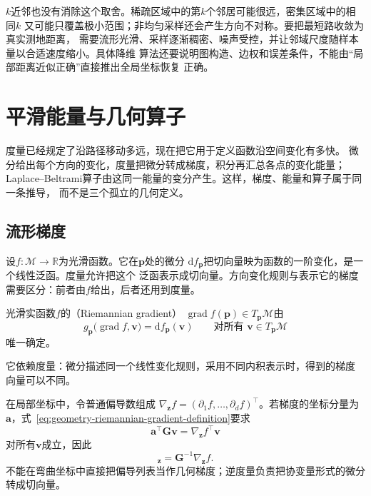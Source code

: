 $k$近邻也没有消除这个取舍。稀疏区域中的第$k$个邻居可能很远，密集区域中的相同$k$
又可能只覆盖极小范围；非均匀采样还会产生方向不对称。要把最短路收敛为真实测地距离，
需要流形光滑、采样逐渐稠密、噪声受控，并让邻域尺度随样本量以合适速度缩小。具体降维
算法还要说明图构造、边权和误差条件，不能由“局部距离近似正确”直接推出全局坐标恢复
正确。

\section{平滑能量与几何算子}
\label{sec:geometry-smoothness-geometric-operators}

度量已经规定了沿路径移动多远，现在把它用于定义函数沿空间变化有多快。
微分给出每个方向的变化，度量把微分转成梯度，积分再汇总各点的变化能量；
Laplace--Beltrami算子由这同一能量的变分产生。这样，梯度、能量和算子属于同一条推导，
而不是三个孤立的几何定义。

\subsection{流形梯度}

设$f:\mathcal{M}\to\mathbb{R}$为光滑函数。它在$\bm{p}$处的微分
$\mathrm{d}f_{\bm{p}}$把切向量映为函数的一阶变化，是一个线性泛函。度量允许把这个
泛函表示成切向量。方向变化规则与表示它的梯度需要区分：前者由$f$给出，后者还用到度量。

\begin{definition}[Riemann梯度]
\label{def:geometry-riemannian-gradient}
光滑实函数$f$的（Riemannian gradient）
$\operatorname{grad}f(\bm{p})\in T_{\bm{p}}\mathcal{M}$由
\begin{equation}
  g_{\bm{p}}\bigl(
    \operatorname{grad}f,\bm{v}
  \bigr)
  =
  \mathrm{d}f_{\bm{p}}(\bm{v})
  \qquad
  \text{对所有 }\bm{v}\in T_{\bm{p}}\mathcal{M}
  \label{eq:geometry-riemannian-gradient-definition}
\end{equation}
唯一确定。
\end{definition}

它依赖度量：微分描述同一个线性变化规则，采用不同内积表示时，得到的梯度
向量可以不同。

在局部坐标中，令普通偏导数组成
$\nabla_{\bm{z}}f=(\partial_1f,\ldots,\partial_df)^{\top}$。若梯度的坐标分量为
$\bm{a}$，式~\eqref{eq:geometry-riemannian-gradient-definition}要求
\[
  \bm{a}^{\top}\bm{G}\bm{v}
  =
  \nabla_{\bm{z}}f^{\top}\bm{v}
\]
对所有$\bm{v}$成立，因此
\begin{equation}
  [\operatorname{grad}f]_{\bm{z}}
  =
  \bm{G}^{-1}\nabla_{\bm{z}}f.
  \label{eq:geometry-riemannian-gradient-coordinates}
\end{equation}
不能在弯曲坐标中直接把偏导列表当作几何梯度；逆度量负责把协变量形式的微分转成切向量。

